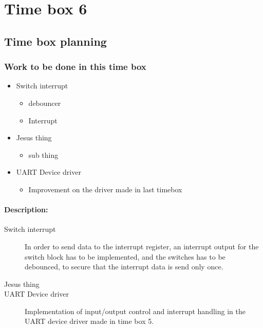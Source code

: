 \section{Time box 6}
\listoftodos
\subsection{Time box planning}

\begin{figure}[H]
	\begin{centering}
	\end{centering}
\end{figure}

\subsubsection{Work to be done in this time box}
\begin{itemize}
	\item Switch interrupt
	\begin{itemize}
		\item debouncer
		\item Interrupt
	\end{itemize}
	\item Jesus thing
		\begin{itemize}
			\item sub thing
		\end{itemize}
	\item UART Device driver
	\begin{itemize}
		\item Improvement on the driver made in last timebox
	\end{itemize}
\end{itemize}

\paragraph{Description:}
\begin{description}
	\item[Switch interrupt] In order to send data to the interrupt register, an interrupt output for the switch block has to be implemented, and the switches has to be debounced, to secure that the interrupt data is send only once.
	\item[Jesus thing]
	\item[UART Device driver] Implementation of input/output control and interrupt handling in the UART device driver made in time box 5.
\end{description}

